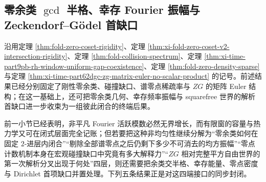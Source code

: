 \subsection{零余类 \texorpdfstring{$\gcd$}{gcd} 半格、幸存 Fourier 振幅与 Zeckendorf--Gödel 首缺口}\label{subsec:conclusion-zero-coset-surviving-amplitude-zg-gap}
沿用定理 \ref{thm:fold-zero-coset-rigidity}、定理 \ref{thm:xi-fold-zero-coset-v2-intersection-rigidity}、定理 \ref{thm:fold-collision-spectrum}、定理 \ref{thm:xi-time-part9pb-rh-window-uniform-gap-coexistence}、定理 \ref{thm:fold-zero-density-sparse} 与定理 \ref{thm:xi-time-part62dgc-zg-matrix-euler-no-scalar-product} 的记号。前述结果已经分别固定了刚性零余类、碰撞缺口、谱零点稀疏率与 \(ZG\) 的矩阵 Euler 结构；在这一基础上，还可把零余类几何、幸存频率振幅与 squarefree 世界的解析首缺口进一步收束为一组彼此闭合的终端后果。

\begin{remark}\label{rem:conclusion-zero-coset-surviving-amplitude-zg-gap-interface}
前一小节已经表明，非平凡 Fourier 活跃模数必然无界增长，而有限窗的容量与热力学又可在闭式层面完全记账；但若要把这种非均匀性继续分解为“零余类如何在固定 \(2\)-进层内闭合”“剔除全部谱零点之后仍剩下多少不可消去的均方振幅”“零点计数机制本身在宏观碰撞缺口中究竟有多大解释力”“\(ZG\) 相对完整平方自由世界的第一次解析分叉出现于何处”四层，则还需要把余类交半格、幸存能量、零点密度与 Dirichlet 首项缺口并置处理。下列五条结果正是对这四端接口的同步封闭。
\end{remark}

